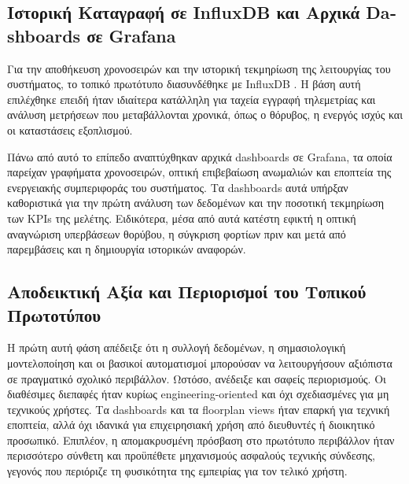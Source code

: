 \subsection{\texorpdfstring{Ιστορική Καταγραφή σε \textlatin{InfluxDB} και Αρχικά \textlatin{Dashboards} σε \textlatin{Grafana}}{Ιστορική Καταγραφή σε InfluxDB και Αρχικά Dashboards σε Grafana}}
Για την αποθήκευση χρονοσειρών και την ιστορική τεκμηρίωση της λειτουργίας του συστήματος, το τοπικό πρωτότυπο διασυνδέθηκε με \textlatin{InfluxDB} \cite{InfluxData2024}. Η βάση αυτή επιλέχθηκε επειδή ήταν ιδιαίτερα κατάλληλη για ταχεία εγγραφή τηλεμετρίας και ανάλυση μετρήσεων που μεταβάλλονται χρονικά, όπως ο θόρυβος, η ενεργός ισχύς και οι καταστάσεις εξοπλισμού.

Πάνω από αυτό το επίπεδο αναπτύχθηκαν αρχικά \textlatin{dashboards} σε \textlatin{Grafana}, τα οποία παρείχαν γραφήματα χρονοσειρών, οπτική επιβεβαίωση ανωμαλιών και εποπτεία της ενεργειακής συμπεριφοράς του συστήματος. Τα \textlatin{dashboards} αυτά υπήρξαν καθοριστικά για την πρώτη ανάλυση των δεδομένων και την ποσοτική τεκμηρίωση των \textlatin{KPIs} της μελέτης. Ειδικότερα, μέσα από αυτά κατέστη εφικτή η οπτική αναγνώριση υπερβάσεων θορύβου, η σύγκριση φορτίων πριν και μετά από παρεμβάσεις και η δημιουργία ιστορικών αναφορών.

\subsection{Αποδεικτική Αξία και Περιορισμοί του Τοπικού Πρωτοτύπου}
Η πρώτη αυτή φάση απέδειξε ότι η συλλογή δεδομένων, η σημασιολογική μοντελοποίηση και οι βασικοί αυτοματισμοί μπορούσαν να λειτουργήσουν αξιόπιστα σε πραγματικό σχολικό περιβάλλον. Ωστόσο, ανέδειξε και σαφείς περιορισμούς. Οι διαθέσιμες διεπαφές ήταν κυρίως \textlatin{engineering-oriented} και όχι σχεδιασμένες για μη τεχνικούς χρήστες. Τα \textlatin{dashboards} και τα \textlatin{floorplan views} ήταν επαρκή για τεχνική εποπτεία, αλλά όχι ιδανικά για επιχειρησιακή χρήση από διευθυντές ή διοικητικό προσωπικό. Επιπλέον, η απομακρυσμένη πρόσβαση στο πρωτότυπο περιβάλλον ήταν περισσότερο σύνθετη και προϋπέθετε μηχανισμούς ασφαλούς τεχνικής σύνδεσης, γεγονός που περιόριζε τη φυσικότητα της εμπειρίας για τον τελικό χρήστη.

